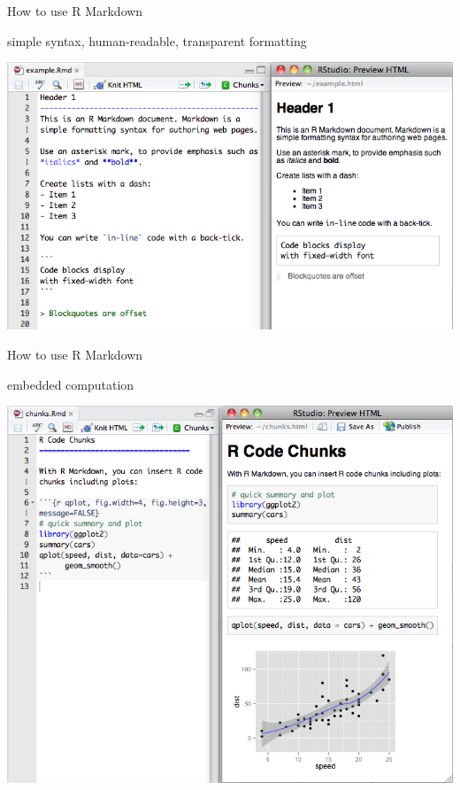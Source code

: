 \begin{frame}{How to use R Markdown}

\begin{block}{simple syntax, human-readable, transparent formatting}

\includegraphics{images/markdownOverview.png}

\end{block}

\end{frame}

\begin{frame}{How to use R Markdown}

\begin{block}{embedded computation}

\includegraphics{images/markdownChunk.png}

\end{block}

\end{frame}


